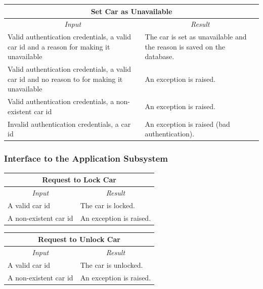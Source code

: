 \documentclass[english]{article}
\begin{document}
\begin{center}
	\begin{tabular}{ | p{6cm} | p{6cm} | }
		\hline 
		\multicolumn{2}{|c|}{\textbf{Set Car as Unavailable}} \\
		\hline
		\multicolumn{1}{|c|}{\textit{Input}} & \multicolumn{1}{c|}{\textit{Result}} \\
		\hline
		Valid authentication credentials, a valid car id and a reason for making it unavailable & The car is set as unavailable and the reason is saved on the database. \\
		\hline
		Valid authentication credentials, a valid car id and no reason to for making it unavailable & An exception is raised.  \\ %
		\hline
		Valid authentication credentials, a non-existent car id & An exception is raised. \\
		\hline
		Invalid authentication credentials, a car id  & An exception is raised (bad authentication). \\
		\hline
	\end{tabular}
\end{center}

\subsubsection{Interface to the Application Subsystem}
\begin{center}
	\begin{tabular}{ | p{6cm} | p{6cm} | }
		\hline
		\multicolumn{2}{|c|}{\textbf{Request to Lock Car}} \\
		\hline
		\multicolumn{1}{|c|}{\textit{Input}} & \multicolumn{1}{c|}{\textit{Result}} \\
		\hline
		A valid car id & The car is locked. \\
		\hline
		A non-existent car id  & An exception is raised. \\
		\hline
	\end{tabular}
\end{center}

\begin{center}
	\begin{tabular}{ | p{6cm} | p{6cm} | }
		\hline 
		\multicolumn{2}{|c|}{\textbf{Request to Unlock Car}} \\
		\hline
		\multicolumn{1}{|c|}{\textit{Input}} & \multicolumn{1}{c|}{\textit{Result}} \\
		\hline
		A valid car id & The car is unlocked. \\
		\hline
		A non-existent car id & An exception is raised. \\
		\hline
	\end{tabular}
\end{center}
\end{document}
